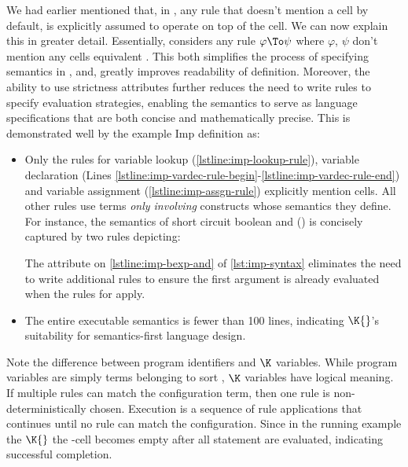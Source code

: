 We had earlier mentioned that, in \K{},
any rule that doesn't mention
a cell by default, is explicitly assumed to operate on top
of the  cell. We can now explain this in greater
detail. Essentially, \K{} considers any rule $\varphi \To \psi$
where $\varphi$, $\psi$ don't mention any cells equivalent
.
This both simplifies the process of specifying semantics in \K{}, and,
greatly improves readability of \K{} definition. Moreover, the
ability to use strictness attributes further reduces the
need to write rules to specify evaluation strategies, enabling
the semantics to serve as language specifications that are both
concise and mathematically precise. This is demonstrated well
by the example Imp definition as:
\begin{itemize}
  \item Only the rules for variable lookup (\autoref{lstline:imp-lookup-rule}),
    variable declaration (Lines
    \ref{lstline:imp-vardec-rule-begin}-\ref{lstline:imp-vardec-rule-end}) and
    variable assignment (\autoref{lstline:imp-assgn-rule}) explicitly
    mention cells. All other rules use terms \emph{only involving} constructs
    whose semantics they define. For instance, the semantics of
    short circuit boolean and (\inlinek{&&}) is concisely captured
    by two rules depicting:
    The  attribute
    on \autoref{lstline:imp-bexp-and} of \autoref{lst:imp-syntax}
    eliminates the need to write additional rules to ensure the
    first argument is already evaluated when the rules for
    \inlinek{&&} apply.
  \item The entire executable semantics is fewer than 100 lines,
    indicating $\K{}$'s suitability for semantics-first language design.
\end{itemize}

Note the difference between program identifiers and $\K$ variables. While
program variables are simply terms belonging to sort ,
$\K$ variables have logical meaning. If multiple rules can match
the configuration term, then one rule is non-deterministically chosen.
Execution is a sequence of rule applications that continues until no
rule can match the configuration. Since in the running example the
$\K{}$ the -cell becomes empty after all statement are evaluated,
indicating successful completion.

